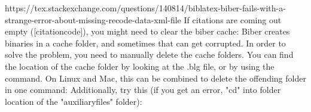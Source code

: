 \markdownRendererUlEndTight \markdownRendererInterblockSeparator
{}\markdownRendererInterblockSeparator
{}
\markdownRendererSectionEnd \markdownRendererSectionBegin
{}\markdownRendererInterblockSeparator
{}https://tex.stackexchange.com/questions/140814/biblatex-biber-fails-with-a-strange-error-about-missing-recode-data-xml-file\markdownRendererInterblockSeparator
{}If citations are coming out empty ([citation\markdownRendererUnderscore{}code]), you might need to clear the biber cache: Biber creates binaries in a cache folder, and sometimes that can get corrupted. In order to solve the problem, you need to manually delete the cache folders. You can find the location of the cache folder by looking at the .blg file, or by using the command.  On Linux and Mac, this can be combined to delete the offending folder in one command: \markdownRendererInterblockSeparator
{}Additionally, try this (if you get an error, "cd" into folder location of the "auxiliary\markdownRendererUnderscore{}files" folder): 
\markdownRendererSectionEnd 
\markdownRendererSectionEnd 
\markdownRendererSectionEnd 
\markdownRendererSectionEnd \markdownRendererDocumentEnd